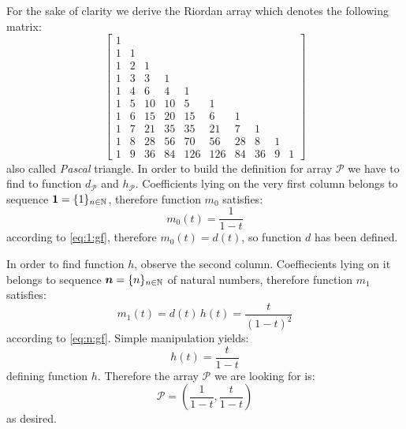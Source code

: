 For the sake of clarity we derive the Riordan array which denotes the
following matrix:
    \begin{displaymath} 
        \left[
        \begin{array}{rrrrrrrrrr}
        1 &  &  &  &  &  &  &  &  &  \\
        1 & 1 &  &  &  &  &  &  &  &  \\
        1 & 2 & 1 &  &  &  &  &  &  &  \\
        1 & 3 & 3 & 1 &  &  &  &  &  &  \\
        1 & 4 & 6 & 4 & 1 &  &  &  &  &  \\
        1 & 5 & 10 & 10 & 5 & 1 &  &  &  &  \\
        1 & 6 & 15 & 20 & 15 & 6 & 1 &  &  &  \\
        1 & 7 & 21 & 35 & 35 & 21 & 7 & 1 &  &  \\
        1 & 8 & 28 & 56 & 70 & 56 & 28 & 8 & 1 &  \\
        1 & 9 & 36 & 84 & 126 & 126 & 84 & 36 & 9 & 1
        \end{array}
        \right] 
    \end{displaymath}
also called \emph{Pascal} triangle. In order to build the definition for array
$\mathcal{P}$ we have to find to function $d_{\mathcal{P}}$ and
$h_{\mathcal{P}}$. Coefficients lying on the very first column belongs to 
sequence $\boldsymbol{1}=\lbrace1\rbrace_{n\in\mathbb{N}}$, therefore function $m_{0}$
satisfies:
\begin{displaymath}
    m_{0}(t)=\frac{1}{1-t}
\end{displaymath}
according to \autoref{eq:1:gf}, therefore $m_{0}(t)=d(t)$, so function $d$ has been
defined. 

In order to find function $h$, observe the second column. Coeffiecients lying on it
belongs to sequence $\boldsymbol{n}=\lbrace n\rbrace_{n\in\mathbb{N}}$ of natural numbers,
therefore function $m_{1}$ satisfies:
\begin{displaymath}
    m_{1}(t)=d(t)\,h(t)=\frac{t}{(1-t)^{2}}
\end{displaymath}
according to \autoref{eq:n:gf}. Simple manipulation yields:
\begin{displaymath}
    h(t)=\frac{t}{1-t}
\end{displaymath}
defining function $h$. Therefore the array $\mathcal{P}$ we are looking for is:
\begin{equation}
    \mathcal{P}=\left(\frac{1}{1-t},\frac{t}{1-t}\right)
    \label{eq:pascal:array:derived:for:example}
\end{equation}
as desired.




